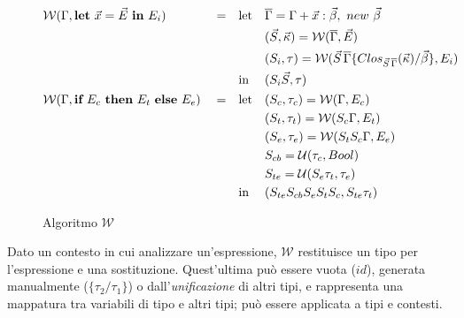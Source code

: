 \begin{figure}
\[\begin{aligned}
\begin{aligned}[t]
            \end{aligned}
            \\
            \algWline{\Gamma}{\textbf{let}\ \vec{x} = \vec{E}\ \textbf{in}\ E_i}
            \begin{aligned}[t]
                 & \text{let} &  & \overline{\Gamma} = \Gamma + \vec{x} : \vec{\beta},\ new\ \vec{\beta}                                                  \\
                 &            &  & (\vec{S}, \vec{\kappa}) = \algW{\overline{\Gamma}}{\vec{E}}                                                            \\
                 &            &  & (S_i, \tau) = \algW{\vec{S}\,\overline{\Gamma} \{Clos_{\vec{S}\,\overline{\Gamma}}(\vec{\kappa}) / \vec{\beta}\}}{E_i} \\
                 & \text{in}  &  & (S_i \vec{S}, \tau)
            \end{aligned}
            \\
            \algWline{\Gamma}{\textbf{if}\ E_c\ \textbf{then}\ E_t\ \textbf{else}\ E_e}
            \begin{aligned}[t]
                 & \text{let} &  & (S_c, \tau_c) = \algW{\Gamma}{E_c}         \\
                 &            &  & (S_t, \tau_t) = \algW{S_c \Gamma}{E_t}     \\
                 &            &  & (S_e, \tau_e) = \algW{S_t S_c \Gamma}{E_e} \\
                 &            &  & S_{cb} = \mathcal{U}(\tau_c, Bool)         \\
                 &            &  & S_{te} = \mathcal{U}(S_e \tau_t, \tau_e)   \\
                 & \text{in}  &  & (S_{te} S_{cb} S_e S_t S_c, S_{te} \tau_t)
            \end{aligned}
        \end{aligned}
    \]
    \caption{Algoritmo $\mathcal{W}$}
    \label{fig:3-4-algorithm-w}
    \vspace{4mm}
\end{figure}

\noindent Dato un contesto in cui analizzare un'espressione, $\mathcal{W}$ restituisce un tipo per l'espressione e una sostituzione.
Quest'ultima può essere vuota ($id$), generata manualmente ($\{\tau_2 / \tau_1\}$) o dall'\textit{unificazione} di altri tipi,
e rappresenta una mappatura tra variabili di tipo e altri tipi; può essere applicata a tipi e contesti.

